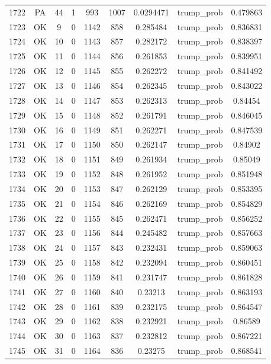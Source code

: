 \documentclass[12pt,a4paper]{article}
\begin{document}
\begin{tabular}{r|cccccccc}
	1722 & PA & 44 & 1 & 993 & 1007 & 0.0294471 & trump\_prob & 0.479863 \\
	1723 & OK & 9 & 0 & 1142 & 858 & 0.285484 & trump\_prob & 0.836831 \\
	1724 & OK & 10 & 0 & 1143 & 857 & 0.282172 & trump\_prob & 0.838397 \\
	1725 & OK & 11 & 0 & 1144 & 856 & 0.261853 & trump\_prob & 0.839951 \\
	1726 & OK & 12 & 0 & 1145 & 855 & 0.262272 & trump\_prob & 0.841492 \\
	1727 & OK & 13 & 0 & 1146 & 854 & 0.262345 & trump\_prob & 0.843022 \\
	1728 & OK & 14 & 0 & 1147 & 853 & 0.262313 & trump\_prob & 0.84454 \\
	1729 & OK & 15 & 0 & 1148 & 852 & 0.261791 & trump\_prob & 0.846045 \\
	1730 & OK & 16 & 0 & 1149 & 851 & 0.262271 & trump\_prob & 0.847539 \\
	1731 & OK & 17 & 0 & 1150 & 850 & 0.262147 & trump\_prob & 0.84902 \\
	1732 & OK & 18 & 0 & 1151 & 849 & 0.261934 & trump\_prob & 0.85049 \\
	1733 & OK & 19 & 0 & 1152 & 848 & 0.261952 & trump\_prob & 0.851948 \\
	1734 & OK & 20 & 0 & 1153 & 847 & 0.262129 & trump\_prob & 0.853395 \\
	1735 & OK & 21 & 0 & 1154 & 846 & 0.262169 & trump\_prob & 0.854829 \\
	1736 & OK & 22 & 0 & 1155 & 845 & 0.262471 & trump\_prob & 0.856252 \\
	1737 & OK & 23 & 0 & 1156 & 844 & 0.245482 & trump\_prob & 0.857663 \\
	1738 & OK & 24 & 0 & 1157 & 843 & 0.232431 & trump\_prob & 0.859063 \\
	1739 & OK & 25 & 0 & 1158 & 842 & 0.232094 & trump\_prob & 0.860451 \\
	1740 & OK & 26 & 0 & 1159 & 841 & 0.231747 & trump\_prob & 0.861828 \\
	1741 & OK & 27 & 0 & 1160 & 840 & 0.23213 & trump\_prob & 0.863193 \\
	1742 & OK & 28 & 0 & 1161 & 839 & 0.232175 & trump\_prob & 0.864547 \\
	1743 & OK & 29 & 0 & 1162 & 838 & 0.232921 & trump\_prob & 0.86589 \\
	1744 & OK & 30 & 0 & 1163 & 837 & 0.232812 & trump\_prob & 0.867221 \\
	1745 & OK & 31 & 0 & 1164 & 836 & 0.23275 & trump\_prob & 0.868541 \\

\end{tabular}
\end{document}
